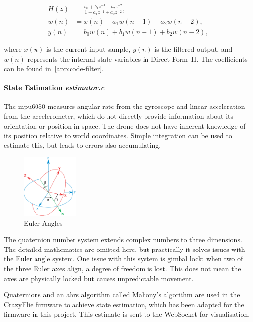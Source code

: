\begin{align}
H(z) &= \frac{b_0 + b_1 z^{-1} + b_2 z^{-2}}{1 + a_1 z^{-1} + a_2 z^{-2}}, \\[6pt]
w(n) &= x(n) - a_1 w(n-1) - a_2 w(n-2), \\[6pt]
y(n) &= b_0 w(n) + b_1 w(n-1) + b_2 w(n-2),
\end{align}

where \( x(n) \) is the current input sample, \( y(n) \) is the filtered output, and \( w(n) \) represents the internal state variables in Direct Form~II. The coefficients can be found in~\ref{app:code-filter}.

\paragraph{\textbf{State Estimation} \textit{estimator.c}} \leavevmode 

The \gls{mpu6050} measures angular rate from the gyroscope and linear acceleration from the accelerometer, which do not directly provide information about its orientation or position in space. The drone does not have inherent knowledge of its position relative to world coordinates. Simple integration can be used to estimate this, but leads to errors also accumulating.

\begin{figure}[H]
    \centering
    \includegraphics[width=0.25\textwidth]{img/euler.PNG}
    \caption{Euler Angles~\cite{euler_angles_wikipedia}}
\end{figure}

The quaternion number system extends complex numbers to three dimensions. The detailed mathematics are omitted here, but practically it solves issues with the Euler angle system. One issue with this system is gimbal lock: when two of the three Euler axes align, a degree of freedom is lost. This does not mean the axes are physically locked but causes unpredictable movement.

Quaternions and an \gls{ahrs} algorithm called Mahony's algorithm are used in the CrazyFlie firmware to achieve state estimation, which has been adapted for the firmware in this project. This estimate is sent to the WebSocket for visualisation.

